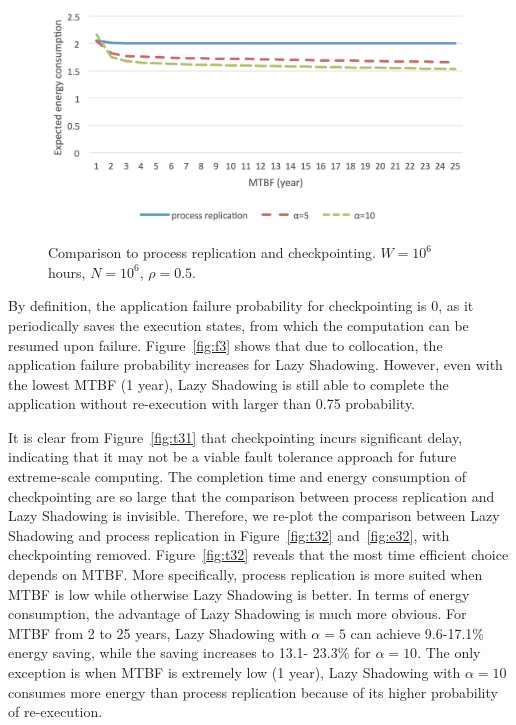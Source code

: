\begin{figure}[!t]
\begin{center}
{			\includegraphics[width=\columnwidth]{Figures/e32}
		} 
	\end{center}
	\caption{Comparison to process replication and checkpointing. $W=10^6$ hours, $N=10^6$, $\rho=0.5$.}
	\label{fig:3}
\end{figure}

By definition, the application failure probability for checkpointing is 0, as it periodically saves the execution states, from which the computation can be resumed upon failure. Figure~\ref{fig:f3} shows that due to collocation, the application failure probability increases for Lazy Shadowing. However, even with the lowest MTBF (1 year), Lazy Shadowing is still able to complete the application without re-execution with larger than 0.75 probability. 

It is clear from Figure~\ref{fig:t31} that checkpointing incurs significant delay, indicating that it may not be a viable fault tolerance approach for future extreme-scale computing. The completion time and energy consumption of checkpointing are so large that the comparison between process replication and Lazy Shadowing is invisible. Therefore, we re-plot the comparison between Lazy Shadowing and process replication in Figure~\ref{fig:t32} and~\ref{fig:e32}, with checkpointing removed. Figure~\ref{fig:t32} reveals that the most time efficient choice depends on MTBF. More specifically, process replication is more suited when MTBF is low while otherwise Lazy Shadowing is better. In terms of energy consumption, the advantage of Lazy Shadowing is much more obvious. For MTBF from 2 to 25 years, Lazy Shadowing with $\alpha=5$ can achieve 9.6-17.1\% energy saving, while the saving increases to 13.1- 23.3\% for $\alpha=10$. The only exception is when MTBF is extremely low (1 year), Lazy Shadowing with $\alpha=10$ consumes more energy than process replication because of its higher probability of re-execution.






